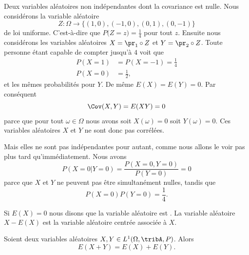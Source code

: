 \begin{example} \label{ExWLzkuWd}
	Deux variables aléatoires non indépendantes dont la covariance est nulle. Nous considérons la variable aléatoire
	\begin{equation}
		Z\colon \Omega\to \{ (1,0),(-1,0),(0,1),(0,-1) \}
	\end{equation}
	de loi uniforme. C'est-à-dire que \(  P\big( Z=z \big)=\frac{1}{ 4 }  \) pour tout \( z\). Ensuite nous considérons les variables aléatoires \( X=\pr_1\circ Z\) et \( Y=\pr_2\circ Z\). Toute personne étant capable de compter jusqu'à \( 4\) voit que
	\begin{subequations}
		\begin{align}
			P(X=1) & =P(X=-1)=\frac{1}{ 4 } \\
			P(X=0) & =\frac{ 1 }{2},
		\end{align}
	\end{subequations}
	et les mêmes probabilités pour \( Y\). De même \( E(X)=E(Y)=0\). Par conséquent
	\begin{equation}
		\Cov(X,Y)=E(XY)=0
	\end{equation}
	parce que pour tout \( \omega\in \Omega\) nous avons soit \( X(\omega)=0\) soit \( Y(\omega)=0\). Ces variables aléatoires \( X\) et \( Y\) ne sont donc pas corrélées.

	Mais elles ne sont pas indépendantes pour autant, comme nous allons le voir pas plus tard qu'immédiatement. Nous avons
	\begin{equation}
		P(X=0|Y=0)=\frac{ P(X=0,Y=0) }{ P(Y=0) }=0
	\end{equation}
	parce que \( X\) et \( Y\) ne peuvent pas être simultanément nulles, tandis que
	\begin{equation}
		P(X=0)P(Y=0)=\frac{1}{ 4 }.
	\end{equation}
\end{example}

\begin{definition}
	Si \( E(X)=0\) nous disons que la variable aléatoire est . La variable aléatoire \( X-E(X)\) est la variable aléatoire centrée associée à \( X\).
\end{definition}

\begin{proposition} \label{PropZBnsCgh}
	Soient deux variables aléatoires \( X,Y\in L^1(\Omega,\tribA, P)\). Alors
	\begin{equation}
		E(X+Y)=E(X)+E(Y).
	\end{equation}
\end{proposition}

